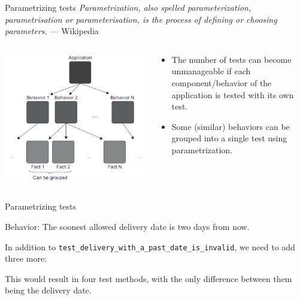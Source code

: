 \documentclass[english,10pt,aspectratio=169,t]{beamer}
\begin{document}
\begin{frame}{Parametrizing tests}
  \footnotesize{\textit{Parametrization, also spelled parameterization, parametrisation
  or parameterisation, is the process of defining or choosing parameters.} --- Wikipedia}
  \begin{columns}[T]
    \begin{column}[]{0.5\textwidth}
      \begin{minipage}{\linewidth}
        \includegraphics[width=\textwidth]{images/parametrized_tests.png}
      \end{minipage}
    \end{column}
    \begin{column}[]{0.5\textwidth}
      \begin{itemize}
        \item The number of tests can become unmanageable if each component/behavior
        of the application is tested with its own test.
        \item Some (similar) behaviors can be grouped into a single test using
        parametrization.
      \end{itemize}
    \end{column}
  \end{columns}
\end{frame}

\begin{frame}{Parametrizing tests}
  \begin{minipage}{\textwidth}
    Behavior: The soonest allowed delivery date is two days from now. 
  \end{minipage}
  \vfill
  \begin{minipage}{\textwidth}
    In addition to \texttt{test\_delivery\_with\_a\_past\_date\_is\_invalid}, we
    need to add three more:

    \additionalbehavior

    This would result in four test methods, with the only difference between them
    being the delivery date.
  \end{minipage}
\end{frame}
\end{document}
